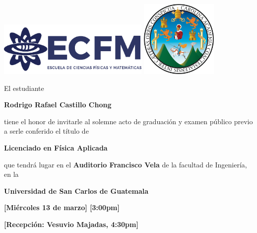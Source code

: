 \documentclass[letterpaper,12pt]{article}
\begin{document}
\pagestyle{empty}



\begin{center}
	\includegraphics[width=0.55\textwidth]{1.png}\hfill
    \includegraphics[width=0.28\textwidth]{usaclogo.png}

    \vspace{1cm}

    {\large El estudiante}

    \vspace{1cm}
    \textbf{\Large Rodrigo Rafael Castillo Chong}

    \vspace{1cm}
\large
    {tiene el honor de invitarle al solemne acto de graduación y examen público previo a serle conferido el título de}

    \vspace{1cm}
    \textbf{\Large Licenciado en Física Aplicada}

    \vspace{1cm}
    {\large que tendrá lugar en el \textbf{Auditorio Francisco Vela} de la facultad de Ingeniería, en la }

    \vspace{1cm}
    {\Large \textbf{Universidad de San Carlos de Guatemala}}
    
    \vspace{1cm}
    \textbf{\large [Miércoles 13 de marzo] \hspace{0.5cm} [3:00pm]}

    \vspace{1cm}
    \textbf{\large [Recepción: Vesuvio Majadas, 4:30pm]}

\end{center}
\end{document}
